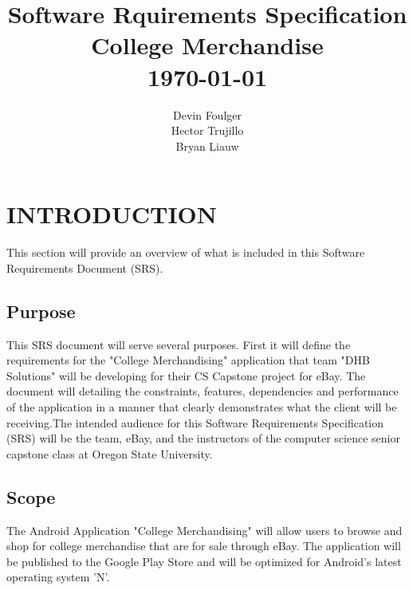 \documentclass[journal,compsoc, 10pt, draftclsnofoot, onecolumn]{IEEEtran}
\begin{document}
\title{Software Rquirements Specification \\{\vspace{-1ex}\huge College Merchandise} \\ {\large \today}}
\author{\vspace{10ex}Devin Foulger \\{\vspace{-1ex}Hector Trujillo} \\{\vspace{-1ex}Bryan Liauw}}

\begin{titlepage}

\maketitle
\thispagestyle{empty}

\end{titlepage}

\tableofcontents

\section{INTRODUCTION}

This section will provide an overview of what is included in this Software 
Requirements Document (SRS).

\subsection{Purpose}

This SRS document will serve several purposes. First it will define the 
requirements for the "College Merchandising" application that team 
"DHB Solutions" will be developing for their CS Capstone project for eBay. The 
document will detailing the constraints, features, dependencies and performance 
of the application in a manner that clearly demonstrates what the client will be
 receiving.The intended audience for this Software Requirements Specification 
(SRS) will be the team, eBay, and the instructors of the computer science senior
 capstone class at Oregon State University. 

\subsection{Scope}

The Android Application "College Merchandising" will allow users to browse and 
shop for college merchandise that are for sale through eBay. The application 
will be published to the Google Play Store and will be optimized for Android's 
latest operating system 'N'. \newline
\end{document}
